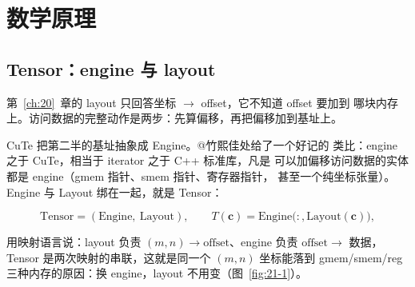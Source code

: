 \section{数学原理}

\subsection{Tensor：engine 与 layout}

第~\ref{ch:20}~章的 layout 只回答坐标 $\to$ offset，它不知道 offset 要加到
哪块内存上。访问数据的完整动作是两步：先算偏移，再把偏移加到基址上。

CuTe 把第二半的基址抽象成 Engine。@竹熙佳处给了一个好记的
类比：engine 之于 CuTe，相当于 iterator 之于 C++ 标准库，凡是
可以加偏移访问数据的实体都是 engine（gmem 指针、smem 指针、寄存器指针，
甚至一个纯坐标张量）。Engine 与 Layout 绑在一起，就是 Tensor：

\begin{equation}
  \mathrm{Tensor} = (\text{Engine},\ \text{Layout}), \qquad
  T(\mathbf{c}) = \mathrm{Engine}\bigl(:, \mathrm{Layout}(\mathbf{c})\bigr) ,
  \label{eq:21-tensor}
\end{equation}

用映射语言说：layout 负责 $(m,n)\to\mathrm{offset}$、engine 负责
$\mathrm{offset}\to$ 数据，Tensor 是两次映射的串联，这就是同一个
$(m,n)$ 坐标能落到 gmem/smem/reg 三种内存的原因：换 engine，layout
不用变（图~\ref{fig:21-1}）。

